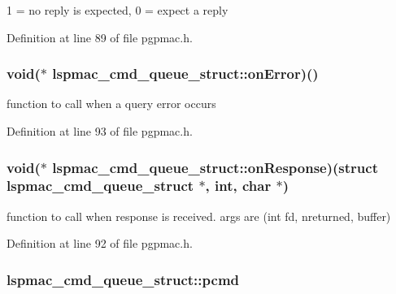 1 = no reply is expected, 0 = expect a reply 



Definition at line 89 of file pgpmac.\-h.

\hypertarget{structlspmac__cmd__queue__struct_a321aa9e980b80c8627ea485ed01eb4f8}{
\subsubsection[{on\-Error}]{\setlength{\rightskip}{0pt plus 5cm}void($\ast$ lspmac\-\_\-cmd\-\_\-queue\-\_\-struct\-::on\-Error)()}}\label{structlspmac__cmd__queue__struct_a321aa9e980b80c8627ea485ed01eb4f8}


function to call when a query error occurs 



Definition at line 93 of file pgpmac.\-h.

\hypertarget{structlspmac__cmd__queue__struct_a08f734865cf7ba341b8666da35ba7d84}{
\subsubsection[{on\-Response}]{\setlength{\rightskip}{0pt plus 5cm}void($\ast$ lspmac\-\_\-cmd\-\_\-queue\-\_\-struct\-::on\-Response)(struct {\bf lspmac\-\_\-cmd\-\_\-queue\-\_\-struct} $\ast$, int, char $\ast$)}}\label{structlspmac__cmd__queue__struct_a08f734865cf7ba341b8666da35ba7d84}


function to call when response is received. args are (int fd, nreturned, buffer) 



Definition at line 92 of file pgpmac.\-h.

\hypertarget{structlspmac__cmd__queue__struct_a9ac7618bbe0faa3001e8efeb1d89010d}{
\subsubsection[{pcmd}]{ lspmac\-\_\-cmd\-\_\-queue\-\_\-struct\-::pcmd}}\label{structlspmac__cmd__queue__struct_a9ac7618bbe0faa3001e8efeb1d89010d}



